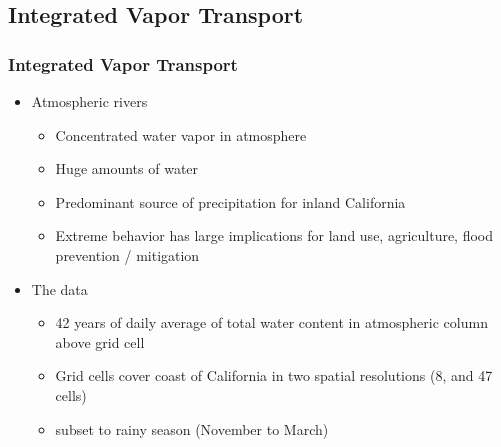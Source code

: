 \documentclass[aspectratio=169,10pt]{beamer}
\begin{document}
\subsection{Integrated Vapor Transport}

\begin{frame}
  \frametitle{Integrated Vapor Transport}
  \begin{minipage}{.7\textwidth}
    \begin{itemize}
        \item Atmospheric rivers~\citep{ralph2013,ralph2018}
            \begin{itemize}
                \item Concentrated water vapor in atmosphere
                \item Huge amounts of water
                \item Predominant source of precipitation for 
                    inland California
                \item Extreme behavior has large implications 
                    for land use, agriculture, flood prevention / mitigation
            \end{itemize}
        \item The data~\citep{guan2015}
            \begin{itemize}
                \item 42 years of daily average of total water content 
                    in atmospheric column above grid cell
                \item Grid cells cover coast of California in two 
                    spatial resolutions (8, and 47 cells)
                \item subset to rainy season (November to March)
            \end{itemize}
    \end{itemize}
  \end{minipage}
  ~\hfill
  \begin{minipage}{.25\textwidth}
    \centering

\end{minipage}
\end{frame}
\end{document}
